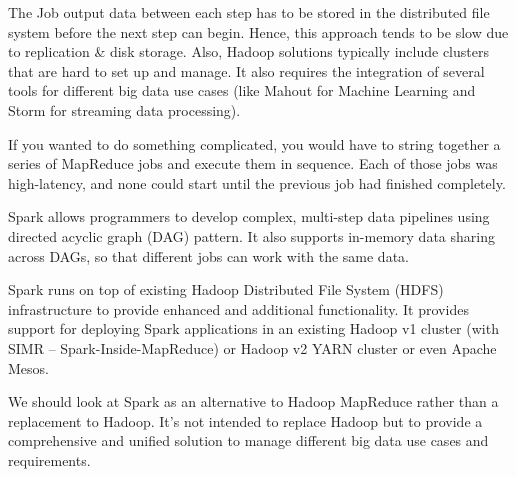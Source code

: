\documentclass[a4paper,12pt]{article}
\begin{document}
The Job output data between each step has to be stored in the distributed file system before the next step can begin. Hence, this approach tends to be slow due to replication & disk storage. Also, Hadoop solutions typically include clusters that are hard to set up and manage. It also requires the integration of several tools for different big data use cases (like Mahout for Machine Learning and Storm for streaming data processing).

If you wanted to do something complicated, you would have to string together a series of MapReduce jobs and execute them in sequence. Each of those jobs was high-latency, and none could start until the previous job had finished completely.

Spark allows programmers to develop complex, multi-step data pipelines using directed acyclic graph (DAG) pattern. It also supports in-memory data sharing across DAGs, so that different jobs can work with the same data.

Spark runs on top of existing Hadoop Distributed File System (HDFS) infrastructure to provide enhanced and additional functionality. It provides support for deploying Spark applications in an existing Hadoop v1 cluster (with SIMR – Spark-Inside-MapReduce) or Hadoop v2 YARN cluster or even Apache Mesos.

We should look at Spark as an alternative to Hadoop MapReduce rather than a replacement to Hadoop. It’s not intended to replace Hadoop but to provide a comprehensive and unified solution to manage different big data use cases and requirements.
\end{document}
